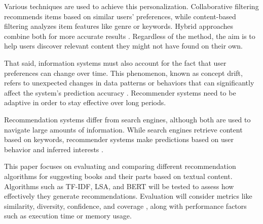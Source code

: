 \documentclass{llncs}
\begin{document}
Various techniques are used to achieve this personalization. Collaborative filtering recommends items based on similar users’ preferences, while content-based filtering analyzes item features like genre or keywords. Hybrid approaches combine both for more accurate results \cite{Aymen2022896}. Regardless of the method, the aim is to help users discover relevant content they might not have found on their own.

That said, information systems must also account for the fact that user preferences can change over time. This phenomenon, known as concept drift, refers to unexpected changes in data patterns or behaviors that can significantly affect the system’s prediction accuracy \cite{Sun2024}. Recommender systems need to be adaptive in order to stay effective over long periods.

Recommendation systems differ from search engines, although both are used to navigate large amounts of information. While search engines retrieve content based on keywords, recommender systems make predictions based on user behavior and inferred interests \cite{De_Nart201484}.

This paper focuses on evaluating and comparing different recommendation algorithms for suggesting books and their parts based on textual content. Algorithms such as TF-IDF, LSA, and BERT will be tested to assess how effectively they generate recommendations. Evaluation will consider metrics like similarity, diversity, confidence, and coverage \cite{Gunawardana2022547}, along with performance factors such as execution time or memory usage.

\end{document}
